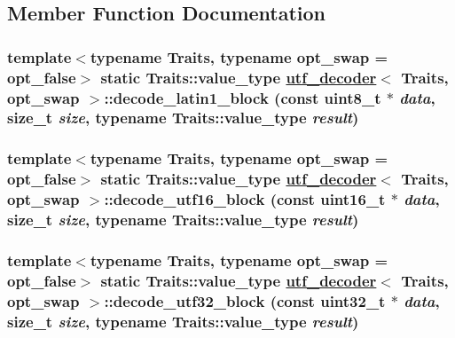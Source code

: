\subsection{Member Function Documentation}
\hypertarget{structutf__decoder_3f728755fa7cc552e30e8d8776cad1ce}{
\subsubsection[decode\_\-latin1\_\-block]{\setlength{\rightskip}{0pt plus 5cm}template$<$typename Traits, typename opt\_\-swap = opt\_\-false$>$ static Traits::value\_\-type \hyperlink{structutf__decoder}{utf\_\-decoder}$<$ Traits, opt\_\-swap $>$::decode\_\-latin1\_\-block (const uint8\_\-t $\ast$ {\em data}, size\_\-t {\em size}, typename Traits::value\_\-type {\em result})}}
\label{structutf__decoder_3f728755fa7cc552e30e8d8776cad1ce}


\hypertarget{structutf__decoder_c22afd983ac79318f0e7d07669bda8d1}{
\subsubsection[decode\_\-utf16\_\-block]{\setlength{\rightskip}{0pt plus 5cm}template$<$typename Traits, typename opt\_\-swap = opt\_\-false$>$ static Traits::value\_\-type \hyperlink{structutf__decoder}{utf\_\-decoder}$<$ Traits, opt\_\-swap $>$::decode\_\-utf16\_\-block (const uint16\_\-t $\ast$ {\em data}, size\_\-t {\em size}, typename Traits::value\_\-type {\em result})}}
\label{structutf__decoder_c22afd983ac79318f0e7d07669bda8d1}


\hypertarget{structutf__decoder_8bed41cc707328e8d8ab91fd7c3c943e}{
\subsubsection[decode\_\-utf32\_\-block]{\setlength{\rightskip}{0pt plus 5cm}template$<$typename Traits, typename opt\_\-swap = opt\_\-false$>$ static Traits::value\_\-type \hyperlink{structutf__decoder}{utf\_\-decoder}$<$ Traits, opt\_\-swap $>$::decode\_\-utf32\_\-block (const uint32\_\-t $\ast$ {\em data}, size\_\-t {\em size}, typename Traits::value\_\-type {\em result})}}
\label{structutf__decoder_8bed41cc707328e8d8ab91fd7c3c943e}


